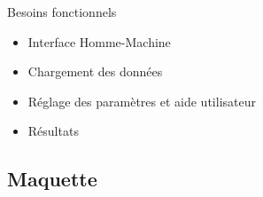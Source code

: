 \documentclass[11pt]{beamer}
\begin{document}
\begin{frame}
	\frametitle{\subsecname}
	\begin{block}{Besoins fonctionnels}
		\begin{itemize}
		\item Interface Homme-Machine
		\item Chargement des données
		\item Réglage des paramètres et aide utilisateur
		\item Résultats
		\end{itemize}
	\end{block}
\end{frame}

\subsection{Maquette}

\begin{frame}
	\frametitle{\subsecname}
	\begin{figure}[h]
		\begin{center}
  		\end{center}	
	 \end{figure}
\end{frame}
\end{document}
